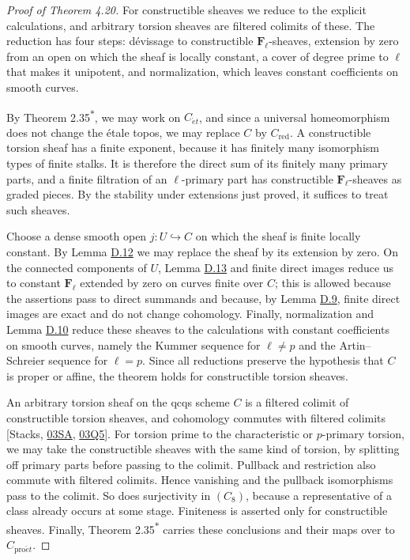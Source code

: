 \documentclass[11pt]{article}
\newcommand{\bpout}[1]{#1\textsuperscript{\hyperlink{bp-outside}{\ensuremath{\ast}}}}
\begin{document}
\begin{proof}[{Proof of Theorem 4.20}]\label{bp222}%
For constructible sheaves we reduce to the explicit calculations, and arbitrary torsion sheaves are filtered colimits of these. The reduction has four steps: dévissage to constructible \(\mathbf F_\ell\)-sheaves, extension by zero from an open on which the sheaf is locally constant, a cover of degree prime to \(\ell\) that makes it unipotent, and normalization, which leaves constant coefficients on smooth curves.

By Theorem \bpout{2.35}, we may work on \(C_{\acute{e}t}\), and since a universal homeomorphism does not change the étale topos, we may replace \(C\) by \(C_{\mathrm{red}}\).  A constructible torsion sheaf has a finite exponent, because it has finitely many isomorphism types of finite stalks.  It is therefore the direct sum of its finitely many primary parts, and a finite filtration of an \(\ell\)-primary part has constructible \(\mathbf F_\ell\)-sheaves as graded pieces.  By the stability under extensions just proved, it suffices to treat such sheaves.

Choose a dense smooth open \(j:U\hookrightarrow C\) on which the sheaf is finite locally constant.  By Lemma \hyperref[bp212]{D.12} we may replace the sheaf by its extension by zero.  On the connected components of \(U\), Lemma \hyperref[bp217]{D.13} and finite direct images reduce us to constant \(\mathbf F_\ell\) extended by zero on curves finite over \(C\); this is allowed because the assertions pass to direct summands and because, by Lemma \hyperref[bp201]{D.9}, finite direct images are exact and do not change cohomology.  Finally, normalization and Lemma \hyperref[bp204]{D.10} reduce these sheaves to the calculations with constant coefficients on smooth curves, namely the Kummer sequence for \(\ell\ne p\) and the Artin–Schreier sequence for \(\ell=p\).  Since all reductions preserve the hypothesis that \(C\) is proper or affine, the theorem holds for constructible torsion sheaves.

An arbitrary torsion sheaf on the qcqs scheme \(C\) is a filtered colimit of constructible torsion sheaves, and cohomology commutes with filtered colimits [Stacks, \href{https://stacks.math.columbia.edu/tag/03SA}{03SA}, \href{https://stacks.math.columbia.edu/tag/03Q5}{03Q5}].  For torsion prime to the characteristic or \(p\)-primary torsion, we may take the constructible sheaves with the same kind of torsion, by splitting off primary parts before passing to the colimit. Pullback and restriction also commute with filtered colimits. Hence vanishing and the pullback isomorphisms pass to the colimit. So does surjectivity in \((C_8)\), because a representative of a class already occurs at some stage. Finiteness is asserted only for constructible sheaves. Finally, Theorem \bpout{2.35} carries these conclusions and their maps over to \(C_{\mathrm{pro}\acute{e}t}\).
\end{proof}
\end{document}
